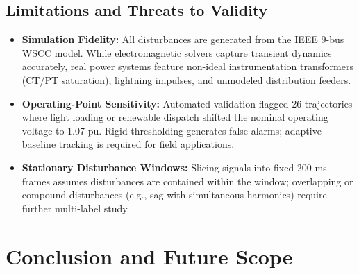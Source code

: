 \documentclass[12pt,a4paper]{report}
\begin{document}
\section{Limitations and Threats to Validity}
\begin{itemize}
    \item \textbf{Simulation Fidelity:} All disturbances are generated from the IEEE 9-bus WSCC model. While electromagnetic solvers capture transient dynamics accurately, real power systems feature non-ideal instrumentation transformers (CT/PT saturation), lightning impulses, and unmodeled distribution feeders.
    \item \textbf{Operating-Point Sensitivity:} Automated validation flagged 26 trajectories where light loading or renewable dispatch shifted the nominal operating voltage to 1.07 pu. Rigid thresholding generates false alarms; adaptive baseline tracking is required for field applications.
    \item \textbf{Stationary Disturbance Windows:} Slicing signals into fixed 200 ms frames assumes disturbances are contained within the window; overlapping or compound disturbances (e.g., sag with simultaneous harmonics) require further multi-label study.
\end{itemize}

\chapter{Conclusion and Future Scope}
\end{document}
